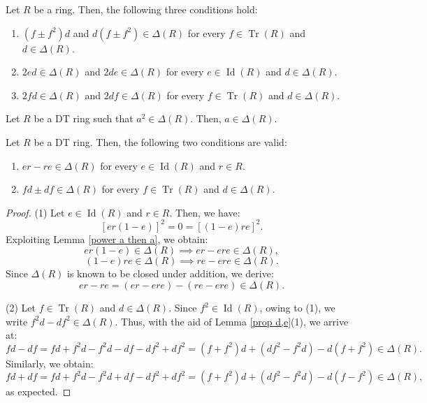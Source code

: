 \documentclass[10pt,a4paper]{amsart}
\begin{document}
\begin{lemma}\label{prop d,e}
Let $R$ be a ring. Then, the following three conditions hold:
\begin{enumerate}
    \item $(f \pm f^2)d$ and $d(f \pm f^2) \in \Delta(R)$ for every $f \in \operatorname{Tr}(R)$ and $d \in \Delta(R)$.
    \item $2ed \in \Delta(R)$ and $2de \in \Delta(R)$ for every $e \in \operatorname{Id}(R)$ and $d \in \Delta(R)$.
    \item $2fd \in \Delta(R)$ and $2df \in \Delta(R)$ for every $f \in \operatorname{Tr}(R)$ and $d \in \Delta(R)$.
\end{enumerate}
\end{lemma}

\begin{lemma}\label{power a then a}
Let $R$ be a DT ring such that $a^2 \in \Delta(R)$. Then, $a \in \Delta(R)$.
\end{lemma}

\begin{lemma}
Let $R$ be a DT ring. Then, the following two conditions are valid:
\begin{enumerate}
    \item $er - re \in \Delta(R)$ for every $e \in \operatorname{Id}(R)$ and $r \in R$.
    \item $fd \pm df \in \Delta(R)$ for every $f \in \operatorname{Tr}(R)$ and $d \in \Delta(R)$.
\end{enumerate}
\end{lemma}

\begin{proof}
(1) Let $e \in \operatorname{Id}(R)$ and $r \in R$. Then, we have:
\[
[er(1-e)]^2 = 0 = [(1-e)re]^2.
\]
Exploiting Lemma \ref{power a then a}, we obtain:
\[
er(1-e) \in \Delta(R) \implies er - ere \in \Delta(R),
\]
\[
(1-e)re \in \Delta(R) \implies re - ere \in \Delta(R).
\]
Since $\Delta(R)$ is known to be closed under addition, we derive:
\[
er - re = (er - ere) - (re - ere) \in \Delta(R).
\]

(2) Let $f \in \operatorname{Tr}(R)$ and $d \in \Delta(R)$. Since $f^2 \in \operatorname{Id}(R)$, owing to (1), we write $f^2d - df^2 \in \Delta(R)$. Thus, with the aid of Lemma \ref{prop d,e}(1), we arrive at:
\[
fd - df = fd + f^2d - f^2d - df - df^2 + df^2 = (f + f^2)d + (df^2 - f^2d) - d(f + f^2) \in \Delta(R).
\]
Similarly, we obtain:
\[
fd + df = fd + f^2d - f^2d + df - df^2 + df^2 = (f + f^2)d + (df^2 - f^2d) - d(f - f^2) \in \Delta(R),
\]
as expected.
\end{proof}
\end{document}
